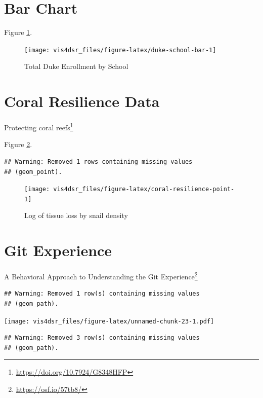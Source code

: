 \documentclass[
]{krantz}
\renewcommand{\href}[2]{#2\footnote{\url{#1}}}
\begin{document}
\hypertarget{bar-chart-1}{%
\section{Bar Chart}\label{bar-chart-1}}

Figure \ref{fig:duke-school-bar}.

\begin{figure}
\texttt{[image: vis4dsr\_files/figure-latex/duke-school-bar-1]} \caption{Total Duke Enrollment by School}\label{fig:duke-school-bar}
\end{figure}

\hypertarget{coral-resilience-data}{%
\section*{Coral Resilience Data}\label{coral-resilience-data}}


\href{https://doi.org/10.7924/G8348HFP}{Protecting coral reefs}

Figure \ref{fig:coral-resilience-point}.

\begin{verbatim}
## Warning: Removed 1 rows containing missing values
## (geom_point).
\end{verbatim}

\begin{figure}
\texttt{[image: vis4dsr\_files/figure-latex/coral-resilience-point-1]} \caption{Log of tissue loss by snail density}\label{fig:coral-resilience-point}
\end{figure}

\hypertarget{git-experience}{%
\section*{Git Experience}\label{git-experience}}


\href{https://osf.io/57tb8/}{A Behavioral Approach to Understanding the Git Experience}

\begin{verbatim}
## Warning: Removed 1 row(s) containing missing values
## (geom_path).
\end{verbatim}

\texttt{[image: vis4dsr\_files/figure-latex/unnamed-chunk-23-1.pdf]}

\begin{verbatim}
## Warning: Removed 3 row(s) containing missing values
## (geom_path).
\end{verbatim}
\end{document}
